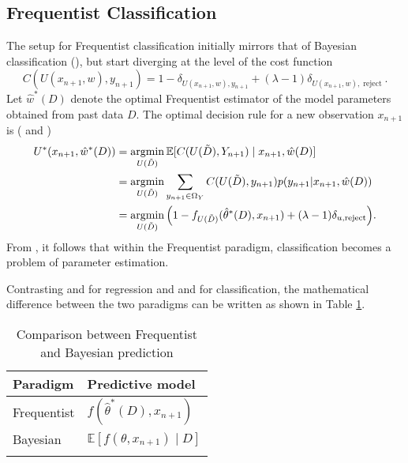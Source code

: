 \subsection{Frequentist Classification}
\label{chp:frequentist_classification}
The setup for Frequentist classification initially mirrors that of Bayesian classification (), but start diverging at the level of the cost function
\begin{equation}
	C(U(x_{n+1},w), y_{n+1}) = 1 - \delta_{U(x_{n+1},w),y_{n+1}} + (\lambda-1)\delta_{U(x_{n+1},w), \operatorname{reject}}.
\end{equation}
Let $\hat{w}^*(D)$ denote the optimal Frequentist estimator of the model parameters obtained from past data $D$. The optimal decision rule for a new observation $x_{n+1}$ is ( and )
\begin{equation}
	\begin{split}
		U^*(x_{n+1}, \hat{w}^*(D)) &= \operatorname*{argmin}_{U(\tilde{D})} \mathbb{E}[C(U(\tilde{D}), Y_{n+1}) \mid x_{n+1}, \hat{w}(D)] \\
		&= \operatorname*{argmin}_{U(\tilde{D})} \sum_{y_{n+1}\in \Omega_Y}C(U(\tilde{D}),y_{n+1})p(y_{n+1}|x_{n+1}, \hat{w}(D)) \\
		&= \operatorname*{argmin}_{U(\tilde{D})} \Big(1 - f_{U(\tilde{D})}(\hat{\theta}^*(D), x_{n+1}) + (\lambda-1)\delta_{u, \operatorname{reject}}\Big).
	\end{split}
	\label{freq:decision_classification}
\end{equation}
From , it follows that within the Frequentist paradigm, classification becomes a problem of parameter estimation.

\begin{remark}
	Contrasting  and  for regression and  and  for classification, the mathematical difference between the two paradigms can be written as shown in Table \ref{tab:comare}.
	\begin{table}[h!]
		\centering
		\caption{Comparison between Frequentist and Bayesian prediction}
		\begin{tabular}{ll}
			\toprule
			\textbf{Paradigm} & \textbf{Predictive model} \\
			\midrule
			Frequentist & $f(\hat{\theta}^*(D), x_{n+1})$ \\[3pt]
			Bayesian    & $\mathbb{E}[f(\theta, x_{n+1}) \mid D]$ \\[3pt]
			\bottomrule
			\label{tab:comare}
		\end{tabular}
	\end{table}
\end{remark}


